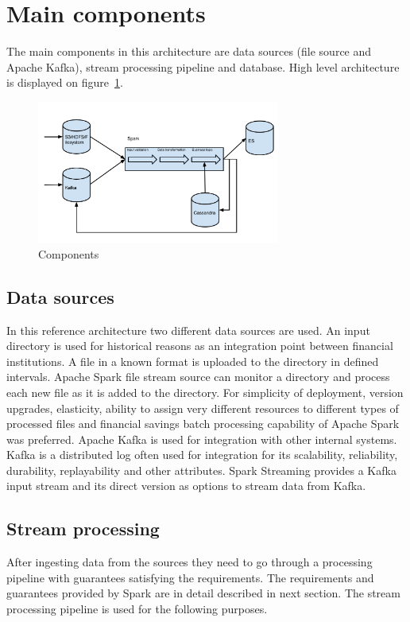 \documentclass[a4paper, 10 pt, conference]{IEEEtran}
\begin{document}
\section{Main components}

The main components in this architecture are data sources (file source and Apache Kafka), stream processing pipeline and database. High level architecture is displayed on figure~\ref{fig:components}. 

\begin{figure}[hb]
	\begin{center}
		\caption{Components}
		\label{fig:components}
		\includegraphics[width=8cm,keepaspectratio]{architecture-diagram.png}
	\end{center}
\end{figure}

\subsection{Data sources}
In this reference architecture two different data sources are used. An input directory is used for historical reasons as an integration point between financial institutions. A file in a known format is uploaded to the directory in defined intervals. Apache Spark file stream source can monitor a directory and process each new file as it is added to the directory. For simplicity of deployment, version upgrades, elasticity, ability to assign very different resources to different types of processed files and financial savings batch processing capability of Apache Spark was preferred.
Apache Kafka is used for integration with other internal systems. Kafka is a distributed log often used for integration for its scalability, reliability, durability, replayability and other attributes. Spark Streaming provides a Kafka input stream and its direct version as options to stream data from Kafka.

\subsection{Stream processing}
After ingesting data from the sources they need to go through a processing pipeline with guarantees satisfying the requirements. The requirements and guarantees provided by Spark are in detail described in next section.
The stream processing pipeline is used for the following purposes.
\end{document}
